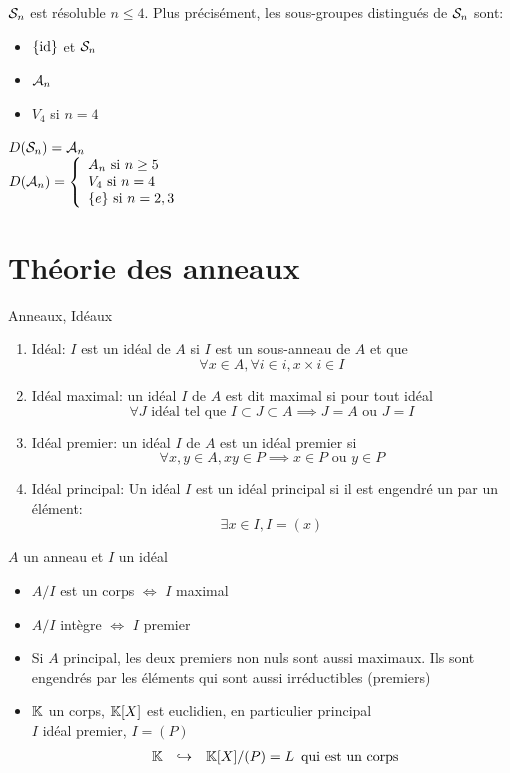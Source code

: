 \documentclass[]{report}
\begin{document}
    \begin{tm}{}{}
        $\mathcal{S}_n$ est résoluble \ssi $n\le 4$. Plus précisément, les sous-groupes distingués de $\mathcal{S}_n$ sont:
        \begin{itemize}
            \item $\{\text{id}\}$ et $\mathcal{S}_n$
            \item $\mathcal{A}_n$
            \item $V_4$ si $n=4$
        \end{itemize}
    \end{tm}

    \begin{re}{}{}
        $D(\mathcal{S}_n)=\mathcal{A}_n$\\
        $D(\mathcal{A}_n)=\left\{\begin{array}{ll} A_n\text{ si } n\ge 5\\
        V_4\text{ si } n=4\\
        \{e\}\text{ si } n=2,3 \end{array} \right.$
    \end{re}

    \chapter{Théorie des anneaux}

    \begin{ra}{Anneaux, Idéaux}{}
        \begin{enumerate}
            \item Idéal: $I$ est un idéal de $A$ si $I$ est un sous-anneau de $A$ et que
            \[\forall x\in A,\forall i\in i, x\times i\in I\]
            \item Idéal maximal: un idéal $I$ de $A$ est dit maximal si pour tout idéal 
            \[\forall J \text{ idéal tel que } I\subset J\subset A\implies J=A\text{ ou }J=I\]
            \item Idéal premier: un idéal $I$ de $A$ est un idéal premier si
            \[\forall x,y\in A,xy\in P\implies x\in P\text{ ou }y\in P\]
            \item Idéal principal: Un idéal $I$ est un idéal principal si il est engendré un par un élément:
            \[\exists x\in I, I=(x)\]
        \end{enumerate}
    \end{ra}

    \begin{lm}{}{}
        $A$ un anneau et $I$ un idéal
        \begin{itemize}
            \item $A/I$ est un corps $\iff$ $I$ maximal
            \item $A/I$ intègre $\iff$ $I$ premier
            \item Si $A$ principal, les deux premiers non nuls sont aussi maximaux. Ils sont engendrés par les éléments qui sont aussi irréductibles (premiers)
            \item $\mathbb{K}$ un corps, $\mathbb{K}[X]$ est euclidien, en particulier principal\\
            $I$ idéal premier, $I=(P)$
            \[\begin{array}{ccccc} \mathbb{K} & \hookrightarrow & \mathbb{K}[X]/(P)=L \end{array}\text{qui est un corps}\]
        \end{itemize}
    \end{lm}
\end{document}
